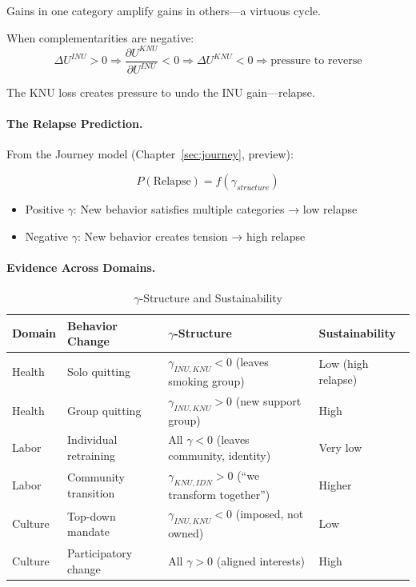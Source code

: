 Gains in one category amplify gains in others---a virtuous cycle.

When complementarities are negative:
\begin{equation}
\Delta U^{INU} > 0 \Rightarrow \frac{\partial U^{KNU}}{\partial U^{INU}} < 0 \Rightarrow \Delta U^{KNU} < 0 \Rightarrow \text{pressure to reverse}
\end{equation}

The KNU loss creates pressure to undo the INU gain---relapse.

\paragraph{The Relapse Prediction.}
From the Journey model (Chapter~\ref{sec:journey}, preview):

\begin{equation}
P(\text{Relapse}) = f(\gamma_{structure})
\end{equation}

\begin{itemize}
\item Positive $\gamma$: New behavior satisfies multiple categories → low relapse
\item Negative $\gamma$: New behavior creates tension → high relapse
\end{itemize}

\paragraph{Evidence Across Domains.}

\begin{table}[htbp]
\centering
\caption{$\gamma$-Structure and Sustainability}
\label{tab:gamma-evidence}
\renewcommand{\arraystretch}{1.3}
\begin{tabular}{@{}llll@{}}
\toprule
\textbf{Domain} & \textbf{Behavior Change} & \textbf{$\gamma$-Structure} & \textbf{Sustainability} \\
\midrule
Health & Solo quitting & $\gamma_{INU,KNU} < 0$ (leaves smoking group) & Low (high relapse) \\
Health & Group quitting & $\gamma_{INU,KNU} > 0$ (new support group) & High \\
Labor & Individual retraining & All $\gamma < 0$ (leaves community, identity) & Very low \\
Labor & Community transition & $\gamma_{KNU,IDN} > 0$ (``we transform together'') & Higher \\
Culture & Top-down mandate & $\gamma_{INU,KNU} < 0$ (imposed, not owned) & Low \\
Culture & Participatory change & All $\gamma > 0$ (aligned interests) & High \\
\bottomrule
\end{tabular}
\end{table}

